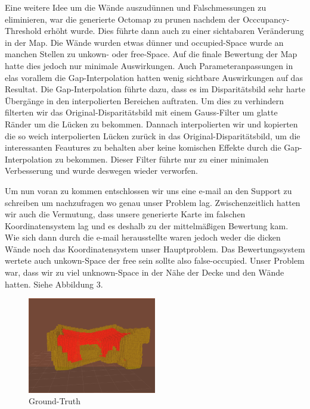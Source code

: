 \documentclass[12pt,titlepage, a4paper]{article}
\begin{document}
Eine weitere Idee um die Wände auszudünnen und Falschmessungen zu eliminieren, war die generierte Octomap zu prunen nachdem der Occcupancy-Threshold erhöht wurde. Dies führte dann auch zu einer sichtabaren Veränderung in der Map. Die Wände wurden etwas dünner und occupied-Space wurde an manchen Stellen zu unkown- oder free-Space. Auf die finale Bewertung der Map hatte dies jedoch nur minimale Auswirkungen. Auch Parameteranpassungen in elas vorallem die Gap-Interpolation hatten wenig sichtbare Auswirkungen auf das Resultat. Die Gap-Interpolation führte dazu, dass es im Disparitätsbild sehr harte Übergänge in den interpolierten Bereichen auftraten. Um dies zu verhindern filterten wir das Original-Disparitätsbild mit einem Gauss-Filter um glatte Ränder um die Lücken zu bekommen. Dannach interpolierten wir und kopierten die so weich interpolierten Lücken zurück in das Original-Disparitätsbild, um die interessanten Feautures zu behalten aber keine komischen Effekte durch die Gap-Interpolation zu bekommen. Dieser Filter führte nur zu einer minimalen Verbesserung und wurde deswegen wieder verworfen.

Um nun voran zu kommen entschlossen wir uns eine e-mail an den Support zu schreiben um nachzufragen wo genau unser Problem lag.
Zwischenzeitlich hatten wir auch die Vermutung, dass unsere generierte Karte im falschen Koordinatensystem lag und es deshalb zu der mittelmäßigen Bewertung kam.
Wie sich dann durch die e-mail herausstellte waren jedoch weder die dicken Wände noch das Koordinatensystem unser Hauptproblem. Das Bewertungssystem wertete auch unkown-Space der free sein sollte also false-occupied. Unser Problem war, dass wir zu viel unknown-Space in der Nähe der Decke und den Wände hatten. Siehe Abbildung 3.

\begin{figure}[h!]
 \centering
 \includegraphics[width=0.5\textwidth]{./Screens/afterPrune.png}
 \caption{Ground-Truth}
 \label{Figure 3}
\end{figure}
\end{document}
